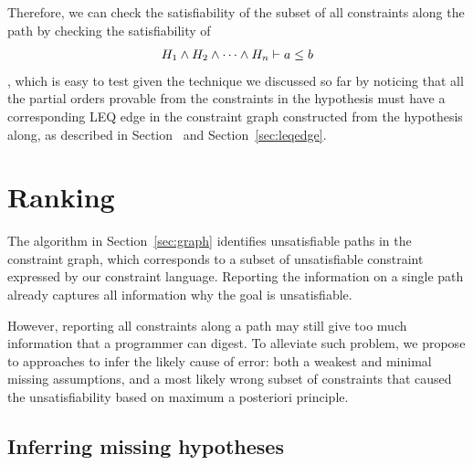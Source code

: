 Therefore, we can check the satisfiability of the subset of all constraints
along the path by checking the satisfiability of 
\[H_1 \land H_2 \land \dots \land H_n \vdash a \leq b\]
, which is easy to test given the technique we discussed so far by noticing
that all the partial orders provable from the constraints in the hypothesis
must have a corresponding LEQ edge in the constraint graph constructed from the
hypothesis along, as described in Section~\label{sec:consgraph} and
Section~\ref{sec:leqedge}.


% 
% 
% 
% 
% 
% 
\section{Ranking}
\label{sec:ranking}

The algorithm in Section~\ref{sec:graph} identifies unsatisfiable paths in the
constraint graph, which corresponds to a subset of unsatisfiable constraint
expressed by our constraint language. Reporting the information on a single
path already captures all information why the goal is unsatisfiable.

However, reporting all constraints along a path may still give too much
information that a programmer can digest. To alleviate such problem, we propose
to approaches to infer the likely cause of error: both a weakest and minimal
missing assumptions, and a most likely wrong subset of constraints that caused
the unsatisfiability based on maximum a posteriori principle.
 

\subsection{Inferring missing hypotheses}
\label{sec:assumptions}

